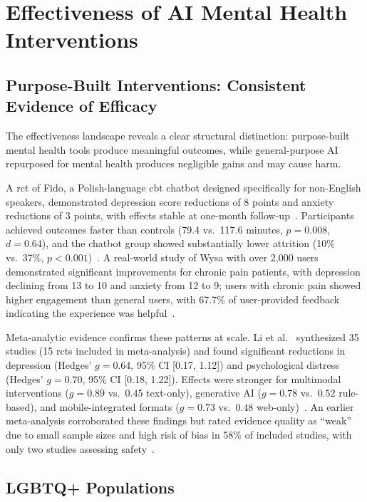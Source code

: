 \section{Effectiveness of AI Mental Health Interventions}

\subsection{Purpose-Built Interventions: Consistent Evidence of Efficacy}

The effectiveness landscape reveals a clear structural distinction: purpose-built mental health tools produce meaningful outcomes, while general-purpose AI repurposed for mental health produces negligible gains and may cause harm.

A \gls{rct} of Fido, a Polish-language \gls{cbt} chatbot designed specifically for non-English speakers, demonstrated depression score reductions of 8 points and anxiety reductions of 3 points, with effects stable at one-month follow-up~\cite{karkosz_2024}. Participants achieved outcomes faster than controls (79.4 vs.\ 117.6 minutes, $p = 0.008$, $d = 0.64$), and the chatbot group showed substantially lower attrition (10\% vs.\ 37\%, $p < 0.001$)~\cite{karkosz_2024}. A real-world study of Wysa with over 2,000 users demonstrated significant improvements for chronic pain patients, with depression declining from 13 to 10 and anxiety from 12 to 9; users with chronic pain showed higher engagement than general users, with 67.7\% of user-provided feedback indicating the experience was helpful~\cite{meheli_2022}.

Meta-analytic evidence confirms these patterns at scale. Li et al.~\cite{li_2023} synthesized 35 studies (15 \gls{rct}s included in meta-analysis) and found significant reductions in depression (Hedges' $g = 0.64$, 95\% CI [0.17, 1.12]) and psychological distress (Hedges' $g = 0.70$, 95\% CI [0.18, 1.22]). Effects were stronger for multimodal interventions ($g = 0.89$ vs.\ $0.45$ text-only), generative AI ($g = 0.78$ vs.\ $0.52$ rule-based), and mobile-integrated formats ($g = 0.73$ vs.\ $0.48$ web-only)~\cite{li_2023}. An earlier meta-analysis corroborated these findings but rated evidence quality as ``weak'' due to small sample sizes and high risk of bias in 58\% of included studies, with only two studies assessing safety~\cite{abd_alrazaq_2020}.

\subsection{LGBTQ+ Populations}

